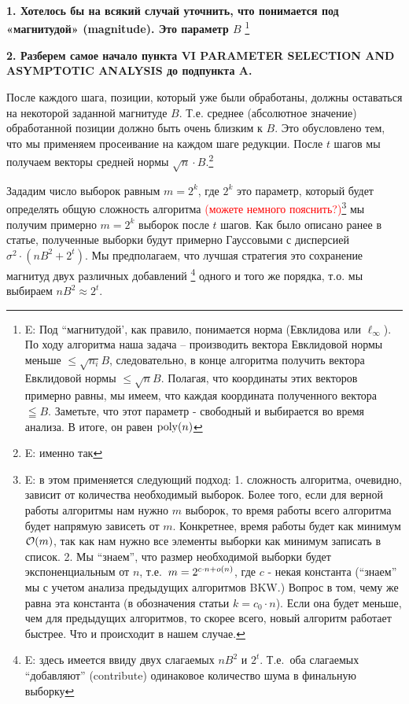 \documentclass[a4paper,11pt]{article}
\begin{document}
\textbf{1. Хотелось бы на всякий случай уточнить, что понимается под «магнитудой» (magnitude). Это параметр $B$ } \footnote{E: 
Под ``магнитудой', как правило, понимается норма (Евклидова или $\ell_\infty$). По ходу алгоритма наша задача -- производить вектора  Евклидовой нормы меньше $\leq \sqrt{n_i}B$, следовательно, в конце алгоритма получить вектора Евклидовой нормы $ \leq \sqrt{n}B$. Полагая, что координаты этих векторов примерно равны, мы имеем, что каждая координата полученного вектора $\leqq B$. Заметьте, что этот параметр - свободный и выбирается во время анализа. В итоге, он равен $\mathrm{poly}(n)$
} 

\textbf{2. Разберем самое начало пункта VI PARAMETER SELECTION AND ASYMPTOTIC ANALYSIS до подпункта A.}

После каждого шага, позиции, который уже были обработаны, должны оставаться на некоторой заданной магнитуде $B$. Т.е. среднее (абсолютное значение) обработанной позиции должно быть очень близким к $B$. Это обусловлено тем, что мы применяем просеивание на каждом шаге редукции. После $t$ шагов мы получаем векторы средней нормы $\sqrt{n}\cdot B$.\footnote{E: именно так} 

Зададим число выборок равным ${m=2^k}$, где $2^k$ это параметр, который будет определять общую сложность алгоритма \textcolor{red}{(можете немного пояснить?)}\footnote{E: в этом применяется следующий подход: 1. сложность алгоритма, очевидно, зависит от количества необходимый выборок. Более того, если для верной работы алгоритмы нам нужно $m$ выборок, то время работы всего алгоритма будет напрямую зависеть от $m$. Конкретнее, время работы будет как минимум $\mathcal{O}(m)$, так как нам нужно все элементы выборки как минимум записать в список. 2. Мы ``знаем'', что размер необходимой выборки  будет экспоненциальным от $n$, т.е.\ $m = 2^{c \cdot n + o(n) }$, где $c$ - некая константа (``знаем'' мы с учетом анализа предыдущих алгоритмов BKW.) Вопрос в том, чему же равна эта константа (в обозначения статьи $k=c_0 \cdot n$). Если она будет меньше, чем для предыдущих алгоритмов, то скорее всего, новый алгоритм работает быстрее. Что и происходит в нашем случае.}
мы получим примерно $m=2^k$ выборок после $t$ шагов. Как было описано ранее в статье, полученные выборки будут примерно Гауссовыми с дисперсией $\sigma^2\cdot(nB^2+2^t)$. Мы предполагаем, что лучшая стратегия это сохранение магнитуд двух различных добавлений \footnote{E: здесь имеется ввиду двух слагаемых $nB^2$ и $2^t$. Т.е.\ оба слагаемых ``добавляют'' (contribute) одинаковое количество шума в финальную выборку} одного и того же порядка, т.о. мы выбираем $nB^2 \approx 2^t$.
\end{document}
